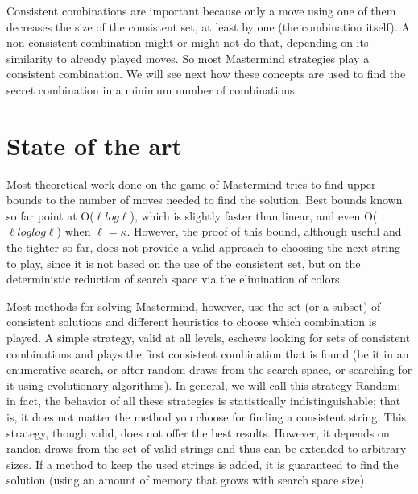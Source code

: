 \documentclass[preprint,12pt]{elsarticle}
\begin{document}
Consistent combinations are important because only a move using one of
them decreases the size of the consistent set, at least by one (the
combination itself). A non-consistent combination might or might not
do that, depending on its similarity to already played moves. So most
Mastermind strategies play a consistent combination. We will see next
how these concepts are used to find the secret combination in a
minimum number of combinations. 

\section{State of the art}
\label{s:soa}

Most theoretical work done on the game of Mastermind tries to find
upper bounds to the number of moves needed to find the solution. Best
bounds known so far \cite{2012arXiv1207.0773D} point at O($\ell log \ell$),
which is slightly faster than linear, and even O($\ell log log \ell$)
when $\ell = \kappa$. However, the proof of this bound, although
useful and the tighter so far, does not provide a valid approach to
choosing the next string to play, since it is not based on the use of
the consistent set, but on the deterministic reduction of search space
via the elimination of colors. 

Most methods for solving Mastermind, however, use  the set (or a subset) of consistent
solutions and different heuristics
to choose which combination is played. A simple
strategy, valid at all levels, eschews looking for sets of consistent
combinations and plays the first consistent
combination that is found (be it in an enumerative search, or after
random draws from the search space, or searching for it using
evolutionary algorithms\cite{mastermind05}). In general, we will call
this strategy Random; in fact, the behavior of all these strategies is
statistically indistinguishable; that is, it does not matter the
method you choose for finding a consistent string. This strategy, though valid, does not
offer the best results. However, it depends on randon draws from the
set of valid strings and thus can be extended to arbitrary sizes. If a
method to keep the used strings is added, it is guaranteed to find the
solution (using an amount of memory that grows with search space
size). 
\end{document}
